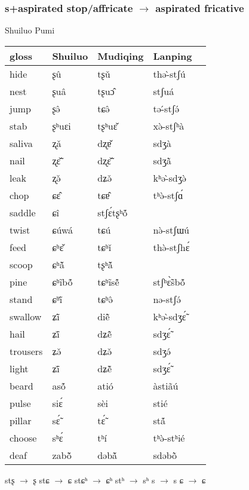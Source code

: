 \documentclass[oldfontcommands,oneside,a4paper,11pt]{article}
\newcommand{\ipa}[1]{{\phon \mbox{#1}}} %
\begin{document}
\subsubsection{s+aspirated stop/affricate $\rightarrow$ aspirated fricative}
Shuiluo Pumi

\begin{table}[H]
\centering
\begin{tabular}{lllll}
\toprule
gloss & 	Shuiluo & 	Mudiqing & 	Lanping \\ 	
\midrule
hide & 	\ipa{ʂû} & 	\ipa{tʂǔ} & 	\ipa{thə-̀stʃú} \\ 	
nest & 	\ipa{ʂuâ} & 	\ipa{tʂuɔ̂} & 	\ipa{stʃuá} \\ 	
jump & 	\ipa{ʂə̂} & 	\ipa{tɕə̂} & 	\ipa{tə-́stʃə́} \\ 	
stab & 	\ipa{ʂʰuɛi} & 	\ipa{tʂʰuɛ̌} & 	\ipa{xə̀-stʃʰà} \\ 	
saliva & 	\ipa{ʐǎ} & 	\ipa{dʐɐ̌} & 	\ipa{sdʒà} \\ 	
nail & 	\ipa{ʐɛ̃̌} & 	\ipa{dʐɛ̃̌} & 	\ipa{sdʒã̀} \\ 	
leak & 	\ipa{ʐə̌} & 	\ipa{dʑə̌} & 	\ipa{kʰə-̀sdʒə̀} \\ 	
chop & 	\ipa{ɕɛ̂} & 	\ipa{tɕɐ̂} & 	\ipa{tʰə̀-stʃɑ́} \\ 	
saddle & 	\ipa{ɕî} & 	\ipa{stʃɛ́tʂʰṍ} & 	\ipa{} \\ 	
twist & 	\ipa{ɕúwá} & 	\ipa{tɕú} & 	\ipa{nə̀-stʃɯú} \\ 	
feed & 	\ipa{ɕʰɛ̌} & 	\ipa{tɕʰǐ} & 	\ipa{thə̀-stʃhɛ́} \\ 	
scoop & 	\ipa{ɕʰã̌} & 	\ipa{tʂʰã̌} & 	\ipa{} \\ 	
pine & 	\ipa{ɕʰĩbṍ} & 	\ipa{tɕʰĩsẽ́} & 	\ipa{stʃʰɛ̃̀sbṍ} \\ 	
stand & 	\ipa{ɕʰĩ̌} & 	\ipa{tɕʰə̂} & 	\ipa{nə-stʃə́} \\ 	
swallow & 	\ipa{ʑĩ̂} & 	\ipa{diẽ̂} & 	\ipa{kʰə-̀sdʒɛ̃́} \\ 	
hail & 	\ipa{ʑĩ̌} & 	\ipa{dʑẽ̂} & 	\ipa{sdʒɛ̃́} \\ 	
trousers & 	\ipa{ʑə̌} & 	\ipa{dʑə̌} & 	\ipa{sdʒə́} \\ 	
light & 	\ipa{ʑĩ̌} & 	\ipa{dʑẽ̌} & 	\ipa{sdʒɛ̃́} \\ 	
beard & 	\ipa{asṍ} & 	\ipa{atió} & 	\ipa{àstiãú} \\ 	
pulse & 	\ipa{siɛ́} & 	\ipa{sèi} & 	\ipa{stié} \\ 	
pillar & 	\ipa{sɛ̃́} & 	\ipa{tɛ̃́} & 	\ipa{stã́} \\ 	
choose & 	\ipa{sʰɛ́} & 	\ipa{tʰí} & 	\ipa{tʰə̀-stʰié} \\ 	
deaf & 	\ipa{zabõ̌} & 	\ipa{dəbã̌} & 	\ipa{sdəbõ̀} \\ 	
\bottomrule
\end{tabular}
\end{table}
\begin{exe}
\ex 
\glt *stʂ $\rightarrow$ ʂ
\glt *stɕ  $\rightarrow$ ɕ
\glt *stɕʰ $\rightarrow$ ɕʰ
\glt *stʰ $\rightarrow$ sʰ
\glt *s $\rightarrow$ s
\glt *ɕ $\rightarrow$ ɕ
\end{exe}
\end{document}
